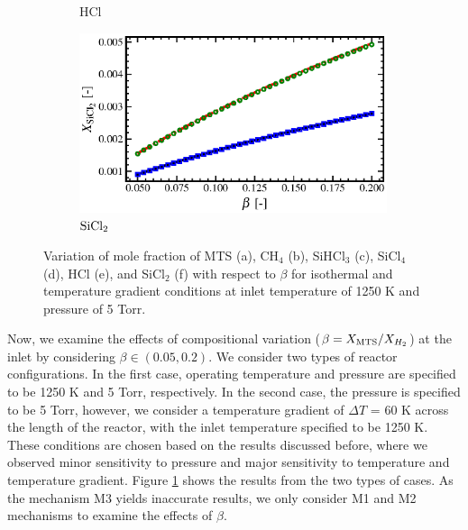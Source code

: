 \documentclass[final, letterpaper, square, comma, numbers, sort&compress]{elsarticle}
\begin{document}
\begin{figure}
\begin{subfigure}{0.49\textwidth}
        \caption{HCl}
    \end{subfigure}
    \begin{subfigure}{0.49\textwidth}
        \centering
        \includegraphics[width=0.99\textwidth]{beta-vs-SiCl2-compare}
        \caption{$\rm SiCl_2$}
    \end{subfigure}
    \caption{Variation of mole fraction of MTS (a), CH$_4$ (b), SiHCl$_3$ (c), SiCl$_4$ (d), HCl (e), and SiCl$_2$ (f) with respect to $\beta$ for isothermal and temperature gradient conditions at inlet temperature of 1250 K and pressure of 5 Torr.}
    \label{fig:11}
\end{figure}


Now, we examine the effects of compositional variation ($\beta = X_{\rm MTS}/X_{H_2}$) at the inlet by considering $\beta \in (0.05,0.2)$. We consider two types of reactor configurations. In the first case, operating temperature and pressure are specified to be 1250 K and 5 Torr, respectively. In the second case, the pressure is specified to be 5 Torr, however, we consider a temperature gradient of $\Delta T$ = 60 K across the length of the reactor, with the inlet temperature specified to be 1250 K. These conditions are chosen based on the results discussed before, where we observed minor sensitivity to pressure and major sensitivity to temperature and temperature gradient. Figure \ref{fig:11} shows the results from the two types of cases. As the mechanism M3 yields inaccurate results, we only consider M1 and M2 mechanisms to examine the effects of $\beta$.
\end{document}
